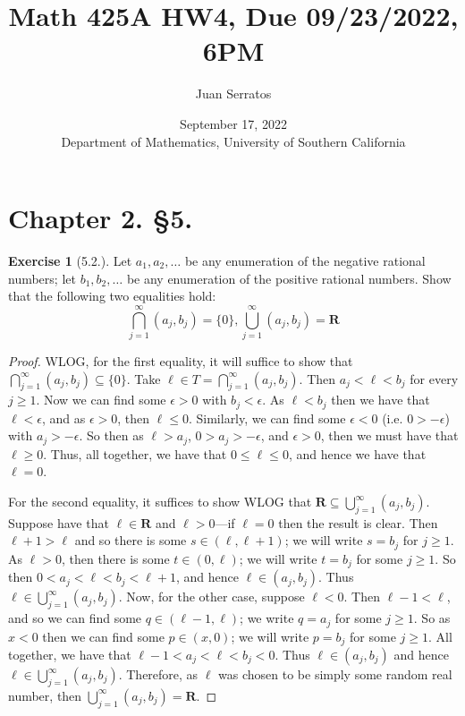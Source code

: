 \documentclass[9pt,reqno]{amsart}
\title{Math 425A HW4, Due 09/23/2022, 6PM}
\author{Juan Serratos}
\date{ September 17, 2022 \\ {Department of Mathematics, University of Southern California}}
\theoremstyle{definition}
\newtheorem{exercise}{Exercise}[section]
\newcommand{\rr}{\mathbf R}
\begin{document}
\maketitle
\setcounter{tocdepth}{4}
\setcounter{secnumdepth}{4}

\section*{Chapter 2. \S 5.}
\begin{exercise}[5.2.] Let $a_1, a_2, \ldots$ be any enumeration of the negative rational numbers; let $b_1, b_2, \ldots$ be any enumeration of the positive rational numbers. Show that the following two equalities hold:
\[
\bigcap^\infty_{j=1} (a_j, b_j) = \{ 0 \}, \bigcup_{j=1}^\infty (a_j, b_j) = \rr
\]
\end{exercise}
\begin{proof} WLOG, for the first equality, it will suffice to show that $\bigcap^\infty_{j=1} (a_j, b_j)  \subseteq \{ 0 \}$. Take $\ell \in T = \bigcap^\infty_{j=1} (a_j, b_j)$. Then $a_j < \ell < b_j$ for every $ j \geq 1$. Now we can find some $\epsilon > 0$ with $b_j < \epsilon$. As $\ell < b_j$ then we have that $ \ell < \epsilon$, and as $\epsilon > 0$, then $\ell \leq 0$. Similarly, we can find some $\epsilon < 0$  (i.e. $0>-\epsilon$) with $a_j > - \epsilon$. So then as $\ell > a_j$, $0>a_j > -\epsilon$, and $\epsilon >0$, then we must have that $\ell \geq 0$. Thus, all together, we have that $0 \leq \ell \leq 0$, and hence we have that $\ell = 0$.

For the second equality, it suffices to show WLOG that $ \rr \subseteq \bigcup_{j=1}^\infty (a_j, b_j )$. Suppose have that $\ell \in \rr$ and $\ell >0$---if $\ell =0$ then the result is clear. Then $\ell +1 > \ell$ and so there is some $s \in (\ell, \ell +1)$; we will write $s = b_j$ for $j \geq 1$. As $\ell >0$, then there is some $t \in (0,\ell )$; we will write $t = b_j$ for some $j \geq 1$. So then $0<a_j < \ell < b_j <\ell +1$, and hence $\ell \in (a_j, b_j)$. Thus $\ell \in \bigcup_{j=1}^\infty (a_j,b_j)$. Now, for the other case, suppose $ \ell < 0$. Then $\ell -1 < \ell$, and so we can find some $q \in (\ell -1, \ell)$; we write $q = a_j$ for some $j \geq 1$. So as $x<0$ then we can find some $p \in (x,0)$; we will write $p = b_j$ for some $j \geq 1$. All together, we have that $\ell -1 <a_j < \ell <b_j <0$. Thus $\ell  \in (a_j, b_j)$ and hence $\ell \in \bigcup_{j=1}^\infty (a_j, b_j)$. Therefore, as $\ell$ was chosen to be simply some random real number, then $\bigcup_{j=1}^\infty (a_j, b_j) = \rr$.
\end{proof}
\end{document}
